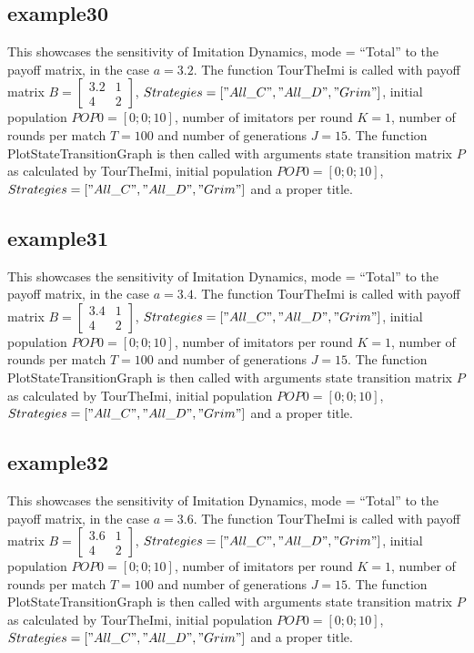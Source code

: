 \subsection{example30}
This showcases the sensitivity of Imitation Dynamics, mode = ``Total'' to the payoff matrix, in the case $a = 3.2$. The function TourTheImi is called with payoff matrix $B = \begin{bmatrix} 3.2 & 1 \\ 4 & 2 \end{bmatrix}$, $Strategies = ["All\_C", "All\_D", "Grim"]$, initial population $POP0 = [0; 0; 10]$, number of imitators per round $K=1$, number of rounds per match $T = 100$ and number of generations $J = 15$. The function PlotStateTransitionGraph is then called with arguments state transition matrix $P$ as calculated by TourTheImi, initial population $POP0 = [0; 0; 10]$, $Strategies = ["All\_C", "All\_D", "Grim"]$ and a proper title.

\subsection{example31}
This showcases the sensitivity of Imitation Dynamics, mode = ``Total'' to the payoff matrix, in the case $a = 3.4$. The function TourTheImi is called with payoff matrix $B = \begin{bmatrix} 3.4 & 1 \\ 4 & 2 \end{bmatrix}$, $Strategies = ["All\_C", "All\_D", "Grim"]$, initial population $POP0 = [0; 0; 10]$, number of imitators per round $K=1$, number of rounds per match $T = 100$ and number of generations $J = 15$. The function PlotStateTransitionGraph is then called with arguments state transition matrix $P$ as calculated by TourTheImi, initial population $POP0 = [0; 0; 10]$, $Strategies = ["All\_C", "All\_D", "Grim"]$ and a proper title.

\subsection{example32}
This showcases the sensitivity of Imitation Dynamics, mode = ``Total'' to the payoff matrix, in the case $a = 3.6$. The function TourTheImi is called with payoff matrix $B = \begin{bmatrix} 3.6 & 1 \\ 4 & 2 \end{bmatrix}$, $Strategies = ["All\_C", "All\_D", "Grim"]$, initial population $POP0 = [0; 0; 10]$, number of imitators per round $K=1$, number of rounds per match $T = 100$ and number of generations $J = 15$. The function PlotStateTransitionGraph is then called with arguments state transition matrix $P$ as calculated by TourTheImi, initial population $POP0 = [0; 0; 10]$, $Strategies = ["All\_C", "All\_D", "Grim"]$ and a proper title.

